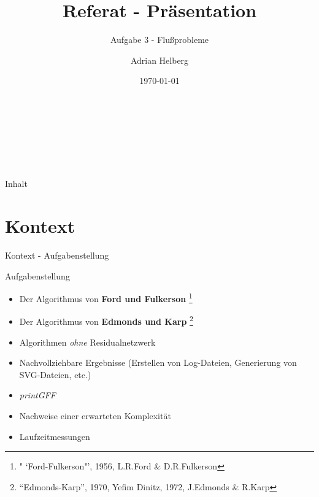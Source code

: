 \documentclass{beamer}
\author{Adrian Helberg}
\title{Referat - Pr\"asentation}
\subtitle{Aufgabe 3 - Flu\ss{}probleme}
\date{\today}
\begin{document}
    \begin{frame}[plain]
        \maketitle
        \small
        \\~\\~\\~\\
    \end{frame}

    \begin{frame}{Inhalt}
        \tableofcontents
    \end{frame}

    \section{Kontext}
    \begin{frame}{Kontext - Aufgabenstellung}
        \begin{block}{Aufgabenstellung}
            \begin{itemize}
                \item Der Algorithmus von \textbf{Ford und Fulkerson} \footnote{" `Ford-Fulkerson"', 1956, L.R.Ford \& D.R.Fulkerson}
                \item Der Algorithmus von \textbf{Edmonds und Karp} \footnote{"`Edmonds-Karp"', 1970, Yefim Dinitz, 1972, J.Edmonds \& R.Karp}
                \item Algorithmen \textit{ohne} Residualnetzwerk
                \item Nachvollziehbare Ergebnisse (Erstellen von Log-Dateien, Generierung von SVG-Dateien, etc.)
                \item \textit{printGFF}
                \item Nachweise einer erwarteten Komplexit\"at
                \item Laufzeitmessungen
            \end{itemize}
        \end{block}
    \end{frame}
\end{document}
